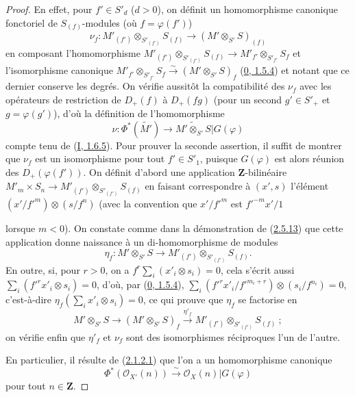 \begin{proof}
En effet, pour $f'\in S'_d$ ($d>0$), on définit un homomorphisme canonique
fonctoriel de $S_{(f)}$-modules (où $f=\varphi(f')$)
\[
\label{II.2.8.8.1-fr}
  \nu_f:M'_{(f')}\otimes_{S'_{(f')}}S_{(f)}
  \longrightarrow(M'\otimes_{S'}S)_{(f)}
\tag{2.8.8.1}
\]
en composant l'homomorphisme
$M'_{(f')}\otimes_{S'_{(f')}}S_{(f)}\to
M'_{f'}\otimes_{S'_{f'}}S_f$ et l'isomorphisme canonique
$M'_{f'}\otimes_{S'_{f'}}S_f\xrightarrow{\sim}(M'\otimes_{S'}S)_f$
(\hyperref[0.1.5.4-fr]{0, 1.5.4}) et notant que ce dernier conserve les
degrés. On vérifie aussitôt la compatibilité des $\nu_f$ avec les opérateurs
de restriction de $D_+(f)$ à $D_+(fg)$ (pour un second $g'\in S'_+$ et
$g=\varphi(g')$), d'où la définition de l'homomorphisme
\[
  \nu:\Phi^*(\widetilde{M'})
  \longrightarrow\widetilde{M'\otimes_{S'}S}|G(\varphi)
\]
compte tenu de (\hyperref[I.1.6.5-fr]{I, 1.6.5}). Pour prouver la seconde
assertion, il suffit de montrer que $\nu_f$ est un isomorphisme pour tout
$f'\in S'_1$, puisque $G(\varphi)$ est alors réunion des
$D_+(\varphi(f'))$. On définit d'abord une application $\mathbf{Z}$-bilinéaire
$M'_m\times S_n\to M'_{(f')}\otimes_{S'_{(f')}}S_{(f)}$ en faisant
correspondre à $(x',s)$ l'élément
$(x'/{f'}^m)\otimes(s/f^n)$ (avec la convention que $x'/{f'}^m$ est
${f'}^{-m}x'/1$

lorsque $m<0$). On constate comme dans la démonstration de
(\hyperref[II.2.5.13-fr]{2.5.13}) que cette application donne naissance à un
di-homomorphisme de modules
\[
  \eta_f:M'\otimes_{S'}S
  \longrightarrow M'_{(f')}\otimes_{S'_{(f')}}S_{(f)}.
\]
En outre, si, pour $r>0$, on a
$f^r\sum_i(x'_i\otimes s_i)=0$, cela s'écrit aussi
$\sum_i({f'}^rx'_i\otimes s_i)=0$, d'où, par
(\hyperref[0.1.5.4-fr]{0, 1.5.4}),
$\sum_i({f'}^rx'_i/{f'}^{m_i+r})\otimes(s_i/f^{n_i})=0$, c'est-à-dire
$\eta_f(\sum_i x'_i\otimes s_i)=0$, ce qui prouve que $\eta_f$ se factorise
en
\[
  M'\otimes_{S'}S\longrightarrow(M'\otimes_{S'}S)_f
  \xrightarrow{\eta'_f}M'_{(f')}\otimes_{S'_{(f')}}S_{(f)}~;
\]
on vérifie enfin que $\eta'_f$ et $\nu_f$ sont des isomorphismes réciproques
l'un de l'autre.

En particulier, il résulte de (\hyperref[II.2.1.2.1-fr]{2.1.2.1}) que l'on a
un homomorphisme canonique
\[
\label{II.2.8.8.2-fr}
  \Phi^*(\mathcal{O}_{X'}(n))\xrightarrow{\sim}
  \mathcal{O}_X(n)|G(\varphi)
\tag{2.8.8.2}
\]
pour tout $n\in\mathbf{Z}$.
\end{proof}

